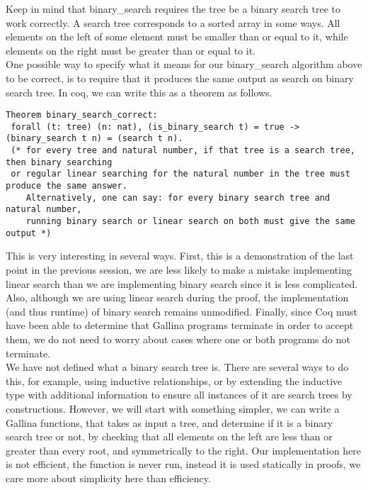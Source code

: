 \documentclass{article}
\begin{document}
Keep in mind that binary\_search requires the tree be a binary search tree
to work correctly. A search tree corresponds to a sorted array in some ways.
All elements on the left of some element must be smaller than or equal to it,
while elements on the right must be greater than or equal to it. \\

One possible way to specify what it means for our binary\_search algorithm above to
be correct, is to require that it produces the same output as search on binary search tree.
In coq, we can write this as a theorem as follows.
\begin{verbatim}
Theorem binary_search_correct:
 forall (t: tree) (n: nat), (is_binary_search t) = true -> (binary_search t n) = (search t n).
 (* for every tree and natural number, if that tree is a search tree, then binary searching
 or regular linear searching for the natural number in the tree must produce the same answer.
    Alternatively, one can say: for every binary search tree and natural number,
    running binary search or linear search on both must give the same output *)
\end{verbatim}

This is very interesting in several ways. First, this is a demonstration of the last point in the
previous session, we are less likely to make a mistake implementing linear search
than we are implementing binary search since it is less complicated. Also, although we are using
linear search during the proof, the implementation (and thus runtime) of binary search remains
unmodified. Finally, since Coq must have been able to determine that Gallina programs terminate in order
to accept them, we do not need to worry about cases where one or both programs do not terminate. \\

We have not defined what a binary search tree is. There are several ways to do this, for example, using
inductive relationships, or by extending the inductive type with additional information to ensure
all instances of it are search trees by constructions. However, we will start with something simpler, we
can write a Gallina functions, that takes as input a tree, and determine if it is a binary search tree or not,
by checking that all elements on the left are less than or greater than every root, and symmetrically to the right.
Our implementation here is not efficient, the function is never run, instead it is used statically in proofs, we
care more about simplicity here than efficiency. \\
\end{document}
